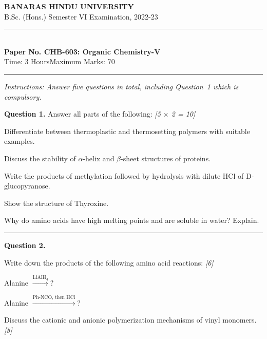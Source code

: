 \documentclass[11pt,a4paper]{article}
\newcommand{\pts}[1]{\hfill   \textit{[#1]}}
\begin{document}
\begin{center}
  {\large\bfseries BANARAS HINDU UNIVERSITY}\\[2pt]
  {\normalsize B.Sc. (Hons.) Semester VI Examination, 2022-23}\\[6pt]
  \rule{0.8\linewidth}{0.5pt}\\[6pt]
  {\large\bfseries Paper No. CHB-603: Organic Chemistry-V}\\[4pt]
  {\normalsize Time: 3 Hours\hfill Maximum Marks: 70}
\end{center}
\rule{\linewidth}{0.4pt}
\small



\noindent   \textit{Instructions: Answer five questions in total, including Question~1 which is compulsory.}

\normalsize
\bigskip




\noindent   \textbf{Question 1.} Answer all parts of the following: \pts{5 $ \times$ 2 = 10}

\begin{parts}
  \item Differentiate between thermoplastic and thermosetting polymers with suitable examples.
  \item Discuss the stability of $\alpha$-helix and $\beta$-sheet structures of proteins.
  \item Write the products of methylation followed by hydrolysis with dilute $ \text{HCl}$ of D-glucopyranose.
  \item Show the structure of Thyroxine.
  \item Why do amino acids have high melting points and are soluble in water? Explain.
\end{parts}

\medskip\rule{\linewidth}{0.2pt}




\noindent   \textbf{Question 2.}

\begin{parts}
  \item Write down the products of the following amino acid reactions: \pts{6}
  
\begin{parts}
    \item Alanine $\xrightarrow{ \text{LiAlH}_4} ?$
    \item Alanine $\xrightarrow{ \text{Ph-NCO, then HCl}} ?$
  \end{parts}
  \item Discuss the cationic and anionic polymerization mechanisms of vinyl monomers. \pts{8}
\end{parts}
\end{document}
